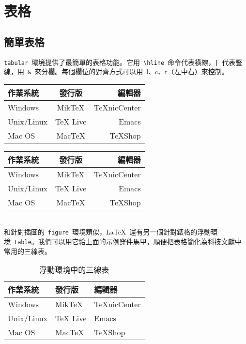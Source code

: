 \chapter{表格}
\label{sec:tables}

\section{簡單表格}
\verb|tabular|~環境提供了最簡單的表格功能。它用~\verb|\hline|~命令代表橫線，\verb+|+~代表豎線，用~\verb|&|~來分欄。每個欄位的對齊方式可以用~l、c、r（左中右）來控制。
\begin{code}
\begin{tabular}{|l|c|r|}
    \hline 
    作業系統 & 發行版 & 編輯器 \\
    \hline 
    Windows & MikTeX & TeXnicCenter \\
    \hline 
    Unix/Linux & TeX Live & Emacs \\
    \hline 
    Mac OS & MacTeX & TeXShop \\
    \hline 
\end{tabular}
\end{code}

\begin{tabular}{|l|c|r|}
    \hline 
    作業系統 & 發行版 & 編輯器 \\
    \hline 
    Windows & MikTeX & TeXnicCenter \\
    \hline 
    Unix/Linux & TeX Live & Emacs \\
    \hline 
    Mac OS & MacTeX & TeXShop \\
    \hline 
\end{tabular}
\ \\

和針對插圖的~\verb|figure|~環境類似，\LaTeX~還有另一個針對錶格的浮動環境~\verb|table|。我們可以用它給上面的示例穿件馬甲，順便把表格簡化為科技文獻中常用的三線表。

\begin{code}
\begin{table}[htbp]
\caption{浮動環境中的三線表}
\label{tab:threesome}
\centering
\begin{tabular}{lll}
    \hline 
    作業系統 & 發行版 & 編輯器 \\
    \hline 
    Windows & MikTeX & TeXnicCenter \\
    Unix/Linux & TeX Live & Emacs \\
    Mac OS & MacTeX & TeXShop \\
    \hline 
\end{tabular}
\end{table}
\end{code}

